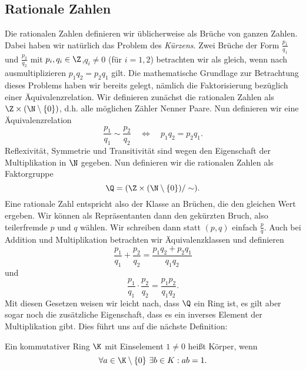 \documentclass[letterpaper,10pt,english]{jupyterBook}
\begin{document}
\subsection{Rationale Zahlen}
\label{\detokenize{grundlagen/zahlensysteme:rationale-zahlen}}
Die rationalen Zahlen definieren wir üblicherweise als Brüche von ganzen Zahlen. Dabei haben wir natürlich das Problem des \emph{Kürzens}. Zwei Brüche der Form \(\frac{p_1}{q_1}\) und \(\frac{p_2}{q_2}\) mit \(p_i, q_i \in \Z\),\(q_i \neq 0\) (für \(i=1,2\)) betrachten wir als gleich, wenn nach ausmultiplizieren
\(p_1 q_2= p_2 q_1\) gilt.
Die mathematische Grundlage zur Betrachtung dieses Problems haben wir bereits gelegt, nämlich die Faktorisierung bezüglich einer Äquivalenzrelation. Wir definieren zunächst die rationalen Zahlen als \(\Z \times (\N \setminus \{0\})\), d.h. alle möglichen Zähler Nenner Paare. Nun definieren wir eine Äquivalenzrelation
\begin{equation*}
\frac{p_1}{q_1} \sim \frac{p_2}{q_2}  \quad \Leftrightarrow \quad p_1 q_2= p_2 q_1.
\end{equation*}
Reflexivität, Symmetrie und Transitivität sind wegen den Eigenschaft der Multiplikation in \(\N\) gegeben.
Nun definieren wir die rationalen Zahlen als Faktorgruppe
\begin{equation*}
\Q = ( \Z \times (\N \setminus \{0\}) /  \sim).
\end{equation*}
Eine rationale Zahl entspricht also der Klasse an Brüchen, die den gleichen Wert ergeben. Wir können als Repräsentanten dann den gekürzten Bruch, also teilerfremde \(p\) und \(q\) wählen. Wir schreiben dann statt \((p,q)\) einfach \(\frac{p}q\). Auch bei Addition und Multiplikation betrachten wir Äquivalenzklassen und definieren
\begin{equation*}
 \frac{p_1}{q_1} +   \frac{p_2}{q_2}  = \frac{p_1 q_2 + p_2 q_1}{q_1q_2}
\end{equation*}
und
\begin{equation*}
 \frac{p_1}{q_1}  \cdot  \frac{p_2}{q_2}  = \frac{p_1   p_2  }{q_1q_2} .
\end{equation*}
Mit diesen Gesetzen weisen wir leicht nach, dass \(\Q\) ein Ring ist, es gilt aber sogar noch die zusätzliche Eigenschaft, dass es ein inverses Element der Multiplikation gibt. Dies führt uns auf die nächste Definition:
\label{grundlagen/zahlensysteme:definition-9}
\begin{definition}{}{}



Ein kommutativer Ring \(\K\) mit Einselement \(1 \neq 0\) heißt Körper, wenn
\begin{equation*}
 \forall a \in\K \setminus \{0\} ~\exists b \in K:  a b = 1.
\end{equation*}\end{definition}
\end{document}
